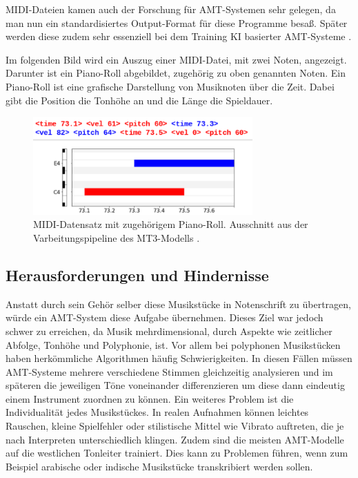 \begin{description}[style=nextline]
MIDI-Dateien kamen auch der Forschung für AMT-Systemen sehr gelegen,
da man nun ein standardisiertes Output-Format für diese Programme besaß.
Später werden diese zudem sehr essenziell bei dem Training KI basierter AMT-Systeme \cite{telila2025cnn}.

Im folgenden Bild wird ein Auszug einer MIDI-Datei, mit zwei Noten, angezeigt.
Darunter ist ein Piano-Roll abgebildet, zugehörig zu oben genannten Noten.
Ein Piano-Roll ist eine grafische Darstellung von Musiknoten über die Zeit.
Dabei gibt die Position die Tonhöhe an und die Länge die Spieldauer.
\begin{figure}[H]
    \centering
    \includegraphics[width=0.75\textwidth]{Graphics/midi_pianoroll}
    \caption[MIDI-Datensatz]{MIDI-Datensatz mit zugehörigem Piano-Roll. Ausschnitt aus der Varbeitungspipeline des MT3-Modells  \cite{mt3colab}.}
    \label{fig:mt3_output_tokens}
\end{figure}
\end{description}

\subsection{Herausforderungen und Hindernisse}
Anstatt durch sein Gehör selber diese Musikstücke in Notenschrift zu übertragen,
würde ein AMT-System diese Aufgabe übernehmen.
Dieses Ziel war jedoch schwer zu erreichen,
da Musik mehrdimensional, durch Aspekte wie zeitlicher Abfolge, Tonhöhe und Polyphonie, ist.
Vor allem bei polyphonen Musikstücken haben herkömmliche Algorithmen häufig Schwierigkeiten.
In diesen Fällen müssen AMT-Systeme mehrere verschiedene Stimmen gleichzeitig analysieren und
im späteren die jeweiligen Töne voneinander differenzieren um diese dann eindeutig einem Instrument zuordnen zu können.
Ein weiteres Problem ist die Individualität jedes Musikstückes.
In realen Aufnahmen können leichtes Rauschen,
kleine Spielfehler oder stilistische Mittel wie Vibrato auftreten,
die je nach Interpreten unterschiedlich klingen.
Zudem sind die meisten AMT-Modelle auf die westlichen Tonleiter trainiert.
Dies kann zu Problemen führen, wenn zum Beispiel
arabische oder indische Musikstücke transkribiert werden sollen.

